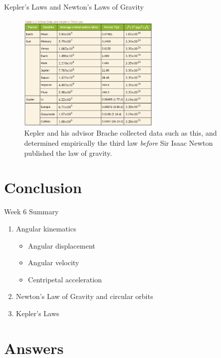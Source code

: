 \documentclass{beamer}
\begin{document}
\begin{frame}{Kepler's Laws and Newton's Laws of Gravity}
\begin{figure}
\centering
\includegraphics[width=0.6\textwidth]{figures/keplertable.png}
\caption{\label{fig:kepler3} Kepler and his advisor Brache collected data such as this, and determined empirically the third law \textit{before} Sir Isaac Newton published the law of gravity.}
\end{figure}
\end{frame}

\section{Conclusion}

\begin{frame}{Week 6 Summary}
\begin{enumerate}
\item \alert{Angular} kinematics
\begin{itemize}
\item Angular displacement
\item Angular velocity
\item Centripetal acceleration
\end{itemize}
\item \alert{Newton's Law of Gravity} and circular orbits
\item Kepler's Laws
\end{enumerate}
\end{frame}

\section{Answers}
\end{document}
